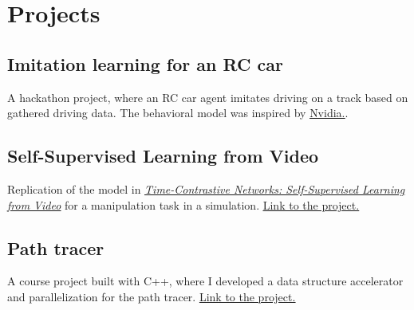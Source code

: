 \documentclass[]{deedy-resume}
\begin{document}
\begin{minipage}[t]{0.66\textwidth}

% 


\section{Projects} 
\subsection{Imitation learning for an RC car}
A hackathon project, where an RC car agent imitates driving on a track based on gathered driving data. The behavioral model was inspired by \href{https://devblogs.nvidia.com/deep-learning-self-driving-cars/}{\underline{Nvidia.}}. 
\sectionsep


\subsection{Self-Supervised Learning from Video}
Replication of the model in \href{https://arxiv.org/abs/1704.06888}{\ul{\textit{Time-Contrastive Networks: Self-Supervised Learning from Video}}} for a manipulation task in a simulation. \href{https://github.com/gamleksi/charlatan}{\underline{Link to the project.}}  
\sectionsep


\subsection{Path tracer}
A course project built with C++, where I developed a data structure accelerator and parallelization for the path tracer. \href{https://github.com/gamleksi/path-tracer}{\underline{Link to the project.}} 
\sectionsep


\end{minipage}
\end{document}
